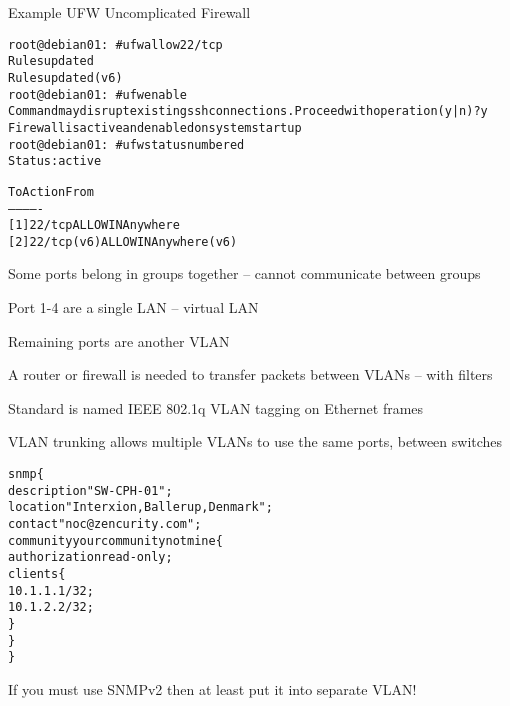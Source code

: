 \documentclass[Screen16to9,17pt]{foils}
\begin{document}

Example UFW Uncomplicated Firewall
\begin{alltt}\footnotesize
root@debian01:~# ufw allow 22/tcp
Rules updated
Rules updated (v6)
root@debian01:~# ufw enable
Command may disrupt existing ssh connections. Proceed with operation (y|n)? y
Firewall is active and enabled on system startup
root@debian01:~# ufw status numbered
Status: active

     To                         Action      From
     --                         ------      ----
[ 1] 22/tcp                     ALLOW IN    Anywhere
[ 2] 22/tcp (v6)                ALLOW IN    Anywhere (v6)
\end{alltt}






\begin{list1}
\item Some ports belong in groups together -- cannot communicate between groups
\item Port 1-4 are a single LAN -- virtual LAN
\item Remaining ports are another VLAN
\item A router or firewall is needed to transfer packets between VLANs -- with filters
\end{list1}



\begin{list1}
\item Standard is named IEEE 802.1q VLAN tagging  on Ethernet frames
\item VLAN trunking allows multiple VLANs to use the same ports, between switches
\end{list1}



\begin{alltt}
snmp \{
    description "SW-CPH-01";
    location "Interxion, Ballerup, Denmark";
    contact "noc@zencurity.com";
    community yourcommunitynotmine \{
        authorization read-only;
        clients \{
            10.1.1.1/32;
            10.1.2.2/32;
        \}
    \}
\}
\end{alltt}

If you must use SNMPv2 then at least put it into separate VLAN!
\end{document}
